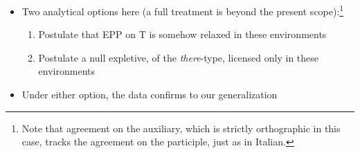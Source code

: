 \documentclass[letterpaper,10pt]{handout_nick}
\begin{document}
\begin{itemize}
\begin{itemize}
\ex. \ag. Il faut que aient \'et\'e  repeint{\bf es} {\bf trois} {\bf chaises}.\\
it requires that have. been repainted. three chairs\\
`It's necessary that there have been three chairs repainted.'
\bg. Il faut qu'il ait \'et\'e  repeint{\bf *(es)} {\bf trois} {\bf chaises}.\\
it requires that-it has. been repainted.(*) three chairs\\
`It's necessary that there have been three chairs repainted.'\\
(Paul Marty, p.c.)

\ex. \ag. Il faut que soient mort{\bf es} {\bf trois} {\bf sauterelles}.\\
it requires that are. died. three grasshoppers\\
`It's necessary that three grasshoppers have died.'
\bg. Il faut qu'il soit mort({\bf *es}) {\bf trois} {\bf sauterelles}.\\
it requires that-it is. died.(*) three grasshoppers\\
`It's necessary that three grasshoppers have died.'\\
(Paul Marty, p.c.) 

\item[$\Rightarrow$] {\bf Eliminating expletive \emph{il} licenses PPA with an \emph{in situ} object} 
\end{itemize}
\item Two analytical options here (a full treatment is beyond the present scope):\footnote{Note that agreement on the auxiliary, which is strictly orthographic in this case, tracks the agreement on the participle, just as in Italian.}
\begin{enumerate}
\item Postulate that EPP on T is somehow relaxed in these environments
\item Postulate a null expletive, of the \emph{there}-type, licensed only in these environments 
\end{enumerate}
\item Under either option, the data confirms to our generalization
\end{itemize}
\end{document}
